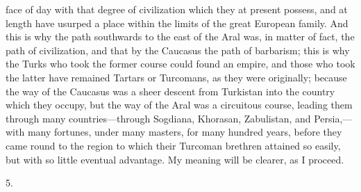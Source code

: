 face of day with that degree of civilization which they at present
possess, and at length have usurped a place within the limits of the
great European family. And this is why the path southwards to the east
of the Aral was, in matter of fact, the path of civilization, and that
by the Caucasus the path of barbarism; this is why the Turks who took
the former course could found an empire, and those who took the latter
have remained Tartars or Turcomans, as they were originally; because
the way of the Caucasus was a sheer descent from Turkistan into the
country which they occupy, but the way of the Aral was a circuitous
course, leading them through many countries—through Sogdiana,
Khorasan, Zabulistan, and Persia,—with many fortunes, under many
masters, for many hundred years, before they came round to the region
to which their Turcoman brethren attained so easily, but with so
little eventual advantage. My meaning will be clearer, as I proceed.

5.


